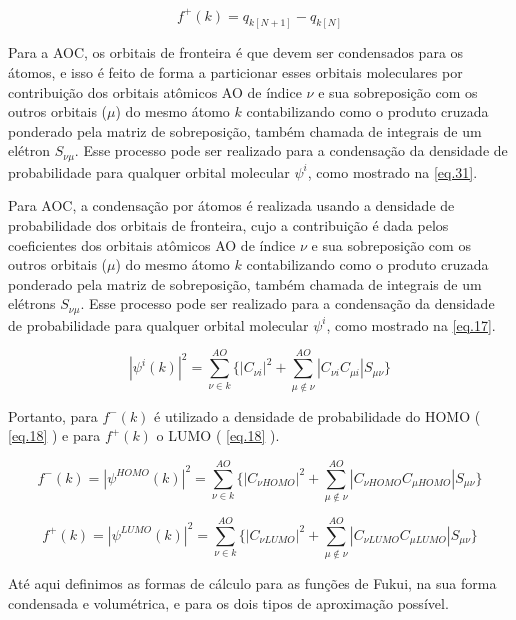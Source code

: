 \documentclass[a4paper,11pt]{refart}
\begin{document}
\begin{equation}
f^{+}(k) = q_{k [N+1]} - q_{k [N]}
\label{eq.16}
\end{equation}

Para a AOC, os orbitais de fronteira é que devem ser condensados para os átomos, e isso é feito de forma a particionar esses orbitais moleculares por contribuição dos orbitais atômicos AO de índice $\nu$ e sua sobreposição com os outros orbitais ($\mu$) do mesmo átomo $k$ contabilizando como o produto cruzada ponderado pela matriz de sobreposição, também chamada de integrais de um elétron $S_{\nu\mu}$. Esse processo pode ser realizado para a condensação da densidade de probabilidade para qualquer orbital molecular $\psi^i$, como mostrado na \autoref{eq.31}. 

Para AOC, a condensação por átomos é realizada usando a densidade de probabilidade dos orbitais de fronteira, cujo a contribuição é dada pelos coeficientes dos orbitais atômicos AO de índice $\nu$ e sua sobreposição com os outros orbitais ($\mu$) do mesmo átomo $k$ contabilizando como o produto cruzada ponderado pela matriz de sobreposição, também chamada de integrais de um elétrons $S_{\nu\mu}$. Esse processo pode ser realizado para a condensação da densidade de probabilidade para qualquer orbital molecular $\psi^i$, como mostrado na \autoref{eq.17}.


\begin{equation}
|\psi^i(k)|^2  =\sum_{\nu \in k}^{AO} \Bigg \{ |C_{\nu i}|^{2} + \sum_{\mu \notin \nu }^{AO} |C_{\nu i} C_{\mu i}|S_{\mu \nu} \Bigg \}
\label{eq.17}
\end{equation}

Portanto, para $f^-(k)$ é utilizado a densidade de probabilidade do HOMO ( \autoref{eq.18} ) e para $f^+(k)$ o LUMO ( \autoref{eq.18} ).

\begin{equation}
f^-(k) =|\psi^{HOMO}(k)|^2 =  \sum_{\nu \in k}^{AO} \Bigg \{ |C_{\nu HOMO}|^{2} + \sum_{\mu \notin \nu }^{AO} |C_{\nu HOMO} C_{\mu HOMO}|S_{\mu \nu} \Bigg \}
\label{eq.18}
\end{equation}

\begin{equation}
f^+(k) = |\psi^{LUMO}(k)|^2 = \sum_{\nu \in k}^{AO} \Bigg \{ |C_{\nu LUMO}|^{2} + \sum_{\mu \notin \nu }^{AO} |C_{\nu LUMO} C_{\mu LUMO}|S_{\mu \nu} \Bigg \}
\label{eq.19}
\end{equation}

Até aqui definimos as formas de cálculo para as funções de Fukui, na sua forma condensada e volumétrica, e para os dois tipos de aproximação possível. 
\end{document}
